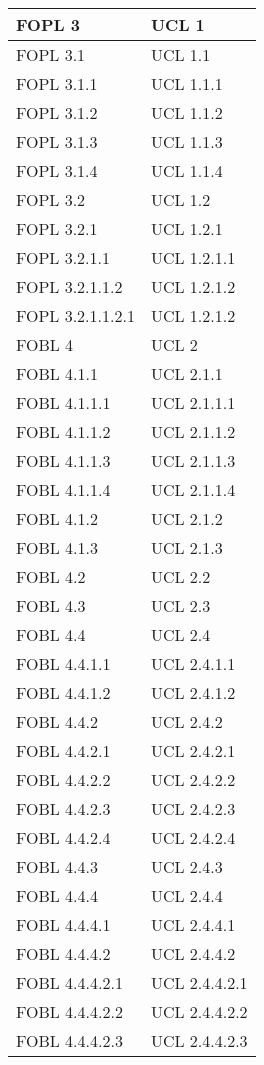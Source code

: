 \begin{longtable}{XX}
FOPL 3&UCL 1\\
\midrule
FOPL 3.1&UCL 1.1\\
\midrule
FOPL 3.1.1&UCL 1.1.1\\
\midrule
FOPL 3.1.2&UCL 1.1.2\\
\midrule
FOPL 3.1.3&UCL 1.1.3\\
\midrule
FOPL 3.1.4&UCL 1.1.4\\
\midrule
FOPL 3.2&UCL 1.2\\
\midrule
FOPL 3.2.1&UCL 1.2.1\\
\midrule
FOPL 3.2.1.1&UCL 1.2.1.1\\
\midrule
FOPL 3.2.1.1.2&UCL 1.2.1.2\\
\midrule
FOPL 3.2.1.1.2.1&UCL 1.2.1.2\\
\midrule
FOBL 4&UCL 2\\
\midrule
FOBL 4.1.1&UCL 2.1.1\\
\midrule
FOBL 4.1.1.1&UCL 2.1.1.1\\
\midrule
FOBL 4.1.1.2&UCL 2.1.1.2\\
\midrule
FOBL 4.1.1.3&UCL 2.1.1.3\\
\midrule
FOBL 4.1.1.4&UCL 2.1.1.4\\
\midrule
FOBL 4.1.2&UCL 2.1.2\\
\midrule
FOBL 4.1.3&UCL 2.1.3\\
\midrule
FOBL 4.2&UCL 2.2\\
\midrule
FOBL 4.3&UCL 2.3\\
\midrule
FOBL 4.4&UCL 2.4\\
\midrule
FOBL 4.4.1.1&UCL 2.4.1.1\\
\midrule
FOBL 4.4.1.2&UCL 2.4.1.2\\
\midrule
FOBL 4.4.2&UCL 2.4.2\\
\midrule
FOBL 4.4.2.1&UCL 2.4.2.1\\
\midrule
FOBL 4.4.2.2&UCL 2.4.2.2\\
\midrule
FOBL 4.4.2.3&UCL 2.4.2.3\\
\midrule
FOBL 4.4.2.4&UCL 2.4.2.4\\
\midrule
FOBL 4.4.3&UCL 2.4.3\\
\midrule
FOBL 4.4.4&UCL 2.4.4\\
\midrule
FOBL 4.4.4.1&UCL 2.4.4.1\\
\midrule
FOBL 4.4.4.2&UCL 2.4.4.2\\
\midrule
FOBL 4.4.4.2.1&UCL 2.4.4.2.1\\
\midrule
FOBL 4.4.4.2.2&UCL 2.4.4.2.2\\
\midrule
FOBL 4.4.4.2.3&UCL 2.4.4.2.3\\

\end{longtable}
